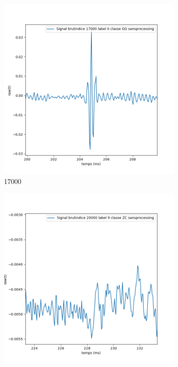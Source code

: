 \begin{figure}[!h]
  \centering
  \begin{subfigure}[b]{0.3\textwidth}
    \includegraphics[width=\textwidth]{./images/indice17000Spectro1Dlabel0classeGGsansprocessingaveczoom.png}
    \caption{17000}
  \end{subfigure}
  \begin{subfigure}[b]{0.3\textwidth}
    \includegraphics[width=\textwidth]{./images/indice20000Spectro1Dlabel9classeZCsansprocessingaveczoom.png}

\end{subfigure}
\end{figure}
